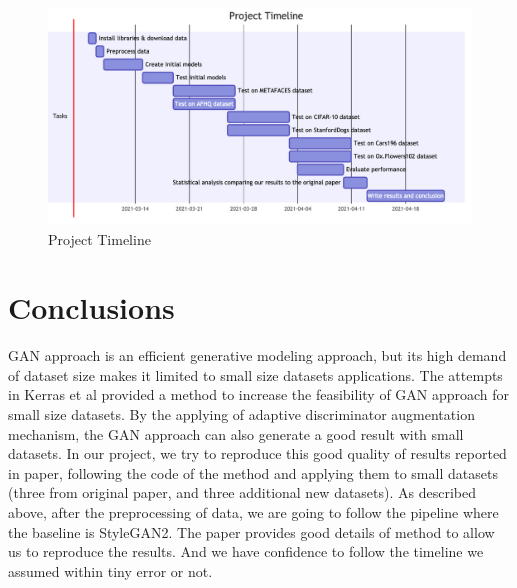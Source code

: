 \documentclass{report}
\begin{document}
\begin{figure}[h]
    \centering 
    \caption{Project Timeline}
    \includegraphics[width=\textwidth]{figs/timeline.png}
\end{figure}



\section{Conclusions}

GAN approach is an efficient generative modeling approach, but its high demand of dataset size makes it limited to small size datasets applications. The attempts in Kerras et al provided a method to increase the feasibility of GAN approach for small size datasets. By the applying of adaptive discriminator augmentation mechanism, the GAN approach can also generate a good result with small datasets. In our project, we try to reproduce this good quality of results reported in paper, following the code of the method and applying them to small datasets (three from original paper, and three additional new datasets). As described above, after the preprocessing of data, we are going to follow the pipeline where the baseline is StyleGAN2.
The paper provides good details of method to allow us to reproduce the results. And we have confidence to follow the timeline we assumed within tiny error or not.









\end{document}
